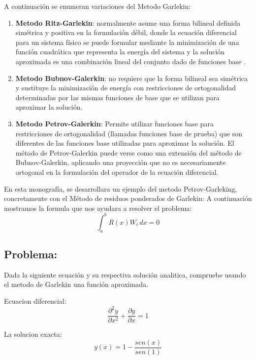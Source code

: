 \documentclass[a4paper,12pt]{article}
\newcommand{\head}[1]{{\bfseries #1}}
\begin{document}
A continuación se enumeran variaciones del 
Metodo Garlekin:
\begin{enumerate}
    \item \head{Metodo Ritz-Garlekin}:
    normalmente asume una forma bilineal definida simétrica 
    y positiva en la formulación débil, donde la ecuación 
    diferencial para un sistema físico se puede formular 
    mediante la minimización de una función cuadrática que 
    representa la energía del sistema y la solución aproximada 
    es una combinación lineal del conjunto dado de funciones base .
    \item \head{Metodo Bubnov-Galerkin}:
    no requiere que la forma bilineal sea simétrica y 
    sustituye la minimización de energía con restricciones 
    de ortogonalidad determinadas por las mismas funciones 
    de base que se utilizan para aproximar la solución.
    \item \head{Metodo Petrov-Galerkin}:
    Permite utilizar funciones base para restricciones de
    ortogonalidad (llamadas funciones base de prueba) que 
    son diferentes de las funciones base utilizadas para 
    aproximar la solución. El método de Petrov-Galerkin\cite{2} 
    puede verse como una extensión del método de Bubnov-Galerkin, 
    aplicando una proyección que no es necesariamente ortogonal 
    en la formulación del operador de la ecuación diferencial.
\end{enumerate}

En esta monografía, se desarrollara un ejemplo del metodo Petrov-Garleking, concretamente
con el Método de residuos ponderados de Garlekin:
A continuación mostramos la formula que nos ayudara a resolver 
el problema\cite{3}:
\begin{equation}
    \int_{a}^{b} R(x)W_i\,dx = 0
\end{equation}

\subsection{Problema:}
Dada la siguiente ecuación y su respectiva solución analitica,
compruebe usando el metodo de Garlekin una función aproximada.

Ecuacion diferencial:
\begin{equation}
    \frac{\partial^2 y}{\partial x^2} + \frac{\partial y}{\partial x} = 1
\end{equation}

La solucion exacta:
\begin{equation}
    y(x) = 1 - \frac{sen(x)}{sen(1)}
\end{equation}
\end{document}
